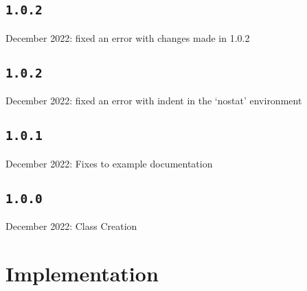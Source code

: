 \documentclass{article}
\begin{document}
				\subsection{\normalfont\texttt{1.0.2}}
 December 2022: fixed an error with changes made in 1.0.2
\subsection{\normalfont\texttt{1.0.2}}
 December 2022: fixed an error with indent in the `nostat' environment
\subsection{\normalfont\texttt{1.0.1}}
 December 2022: Fixes to example documentation

\subsection{\normalfont\texttt{1.0.0}}
 December 2022: Class Creation


	\clearpage\section{Implementation}
	
\end{document}
